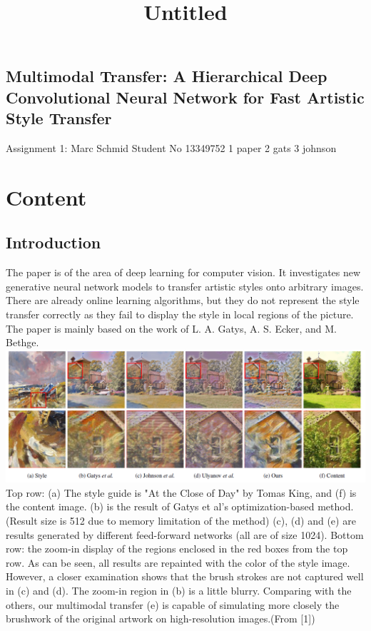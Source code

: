 \documentclass[11pt]{article}
\title{Untitled}
\makeatletter
\def\maxwidth{\ifdim\Gin@nat@width>\linewidth\linewidth
    \else\Gin@nat@width\fi}
\let\Oldincludegraphics\includegraphics
\renewcommand{\includegraphics}[1]{\Oldincludegraphics[width=.8\maxwidth]{#1}}
\makeatother
\begin{document}
    
    
    \maketitle
    
    

    
    \subsection{Multimodal Transfer: A Hierarchical Deep Convolutional
Neural Network for Fast Artistic Style
Transfer}\label{multimodal-transfer-a-hierarchical-deep-convolutional-neural-network-for-fast-artistic-style-transfer}

    Assignment 1: Marc Schmid Student No 13349752 1 paper 2 gats 3 johnson

    \section{Content}\label{content}

\subsection{Introduction}\label{introduction}

The paper is of the area of deep learning for computer vision. It
investigates new generative neural network models to transfer artistic
styles onto arbitrary images. There are already online learning
algorithms, but they do not represent the style transfer correctly as
they fail to display the style in local regions of the picture. The
paper is mainly based on the work of L. A. Gatys, A. S. Ecker, and M.
Bethge. \includegraphics{firstPic.png} Top row: (a) The style guide is
"At the Close of Day" by Tomas King, and (f) is the content image. (b)
is the result of Gatys et al's optimization-based method. (Result size
is 512 due to memory limitation of the method) (c), (d) and (e) are
results generated by different feed-forward networks (all are of size
1024). Bottom row: the zoom-in display of the regions enclosed in the
red boxes from the top row. As can be seen, all results are repainted
with the color of the style image. However, a closer examination shows
that the brush strokes are not captured well in (c) and (d). The zoom-in
region in (b) is a little blurry. Comparing with the others, our
multimodal transfer (e) is capable of simulating more closely the
brushwork of the original artwork on high-resolution images.(From
{[}1{]})
\end{document}
